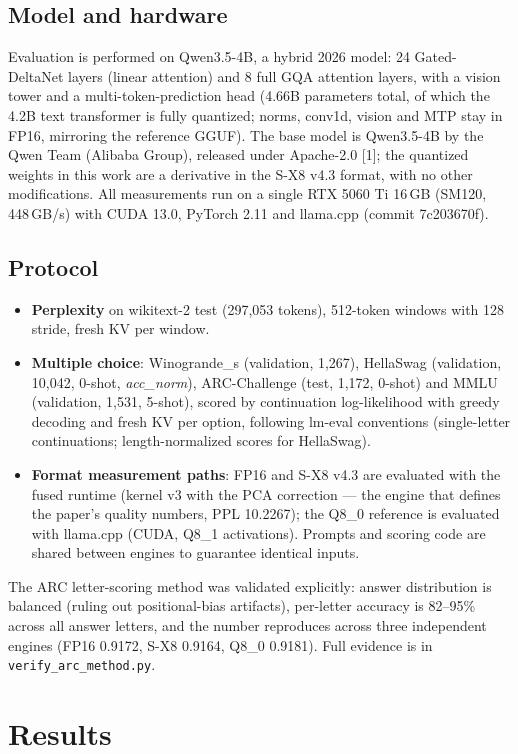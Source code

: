 \documentclass[11pt]{article}
\begin{document}
\subsection{Model and hardware}
Evaluation is performed on Qwen3.5-4B, a hybrid 2026 model: 24 Gated-DeltaNet layers (linear attention) and 8 full
GQA attention layers, with a vision tower and a multi-token-prediction head (4.66B parameters total, of
which the 4.2B text transformer is fully quantized; norms, conv1d, vision and MTP stay in FP16, mirroring
the reference GGUF). The base model is Qwen3.5-4B by the Qwen Team (Alibaba Group), released under
Apache-2.0 [1]; the quantized weights in this work are a derivative in the S-X8 v4.3 format, with no
other modifications. All measurements run on a single RTX 5060 Ti 16\,GB (SM120, 448\,GB/s) with CUDA
13.0, PyTorch 2.11 and llama.cpp (commit 7c203670f).

\subsection{Protocol}
\begin{itemize}
\item \textbf{Perplexity} on wikitext-2 test (297,053 tokens), 512-token windows with 128 stride, fresh
KV per window.
\item \textbf{Multiple choice}: Winogrande\_s (validation, 1,267), HellaSwag (validation, 10,042, 0-shot,
\textit{acc\_norm}), ARC-Challenge (test, 1,172, 0-shot) and MMLU (validation, 1,531, 5-shot), scored by
continuation log-likelihood with greedy decoding and fresh KV per option, following lm-eval conventions
(single-letter continuations; length-normalized scores for HellaSwag).
\item \textbf{Format measurement paths}: FP16 and S-X8 v4.3 are evaluated with the fused runtime
(kernel v3 with the PCA correction --- the engine that defines the paper's quality numbers, PPL 10.2267);
the Q8\_0 reference is evaluated with llama.cpp (CUDA, Q8\_1 activations). Prompts and scoring code are
shared between engines to guarantee identical inputs.
\end{itemize}
The ARC letter-scoring method was validated explicitly: answer distribution is balanced (ruling out
positional-bias artifacts), per-letter accuracy is 82--95\% across all answer letters, and the number
reproduces across three independent engines (FP16 0.9172, S-X8 0.9164, Q8\_0 0.9181). Full evidence is in
\verb|verify_arc_method.py|.

\section{Results}
\end{document}

